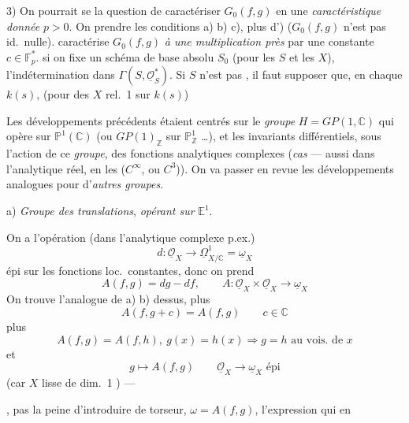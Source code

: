 \documentclass[11pt,a4paper]{article}
\begin{document}
3) On pourrait se   la question de caractériser $G_0(f,g)$ en une \emph{caractéristique donnée} $p > 0$. On  prendre les conditions a) b) c), plus d') ($G_0(f,g)$ n'est pas id.\ nulle).
\emph{\ill{}} caractérise $G_0(f,g)$ \emph{à une multiplication près} par une constante $c \in \mathbb{F}_p^*$. \ill{} \ill{} si on fixe un schéma de base absolu $S_0$ (pour les $S$ et les $X$), l'indétermination  dans $\Gamma(S, \underline{\mathcal{O}}_S^*)$. Si $S$ n'est pas , il faut supposer que, en chaque $k(s)$, \ill{} (pour des $X$  \struck{\ill{}}  rel.\ 1 sur $k(s)$)

Les développements précédents étaient centrés sur le \emph{groupe} $H = GP(1, \mathbb{C})$ qui opère sur $\mathbb{P}^1(\mathbb{C})$ (ou $GP(1)_{\mathbb{Z}}$ sur $\mathbb{P}^1_{\mathbb{Z}}$ …), et les invariants différentiels, sous l'action de ce \emph{groupe}, des fonctions analytiques complexes (\emph{cas}  —  aussi dans l'analytique réel, en les ($C^\infty$, ou $C^3$)). On va passer en revue les développements analogues pour d'\emph{autres groupes}.

a) \emph{Groupe des translations}, \emph{opérant sur} $\mathbb{E}^1$.

On a l'opération (dans l'analytique complexe p.ex.)
\[
d : \underline{\mathcal{O}}_X \longrightarrow \underline{\Omega}^1_{X/\mathbb{C}} = \underline{\omega}_X
\]
épi   sur les fonctions loc.\ constantes, donc on prend
\[
A(f,g) = dg - df, \qquad A : \underline{\mathcal{O}}_X \times \underline{\mathcal{O}}_X \longrightarrow \underline{\omega}_X
\]
On trouve l'analogue de a) b) dessus, plus
\[
A(f, g+c) = A(f,g) \qquad c \in \mathbb{C}
\]
plus
\[
A(f,g) = A(f,h),\ g(x) = h(x) \Longrightarrow g = h \text{ au vois.\ de } x
\]
et
\[
g \longmapsto A(f,g) \qquad \underline{\mathcal{O}}_X \to \underline{\omega}_X \text{ épi}
\]
(car $X$ lisse de dim.\ 1 ) — 

, pas la peine d'introduire de torseur,  $\omega = A(f,g)$,  l'expression \ill{} \ill{} \ill{} qui en  \ill{}
\end{document}
